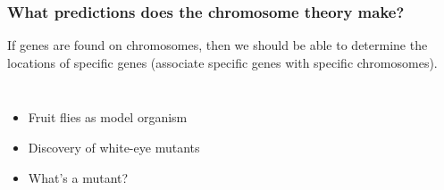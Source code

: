 \begin{frame}
    \frametitle{What predictions does the chromosome theory make?}
    \begin{adjustwidth}{-2em}{-2em}
    If genes are found on chromosomes, then we should be able to determine the
    locations of specific genes (associate specific genes with specific
    chromosomes).

    \begin{columns}
        
        \begin{itemize}
            \item<2-> Fruit flies as model organism
            \item<3-> Discovery of white-eye mutants
            \item<4-> What's a mutant? 
        \end{itemize}


    \end{columns}
    \end{adjustwidth}

\end{frame}

